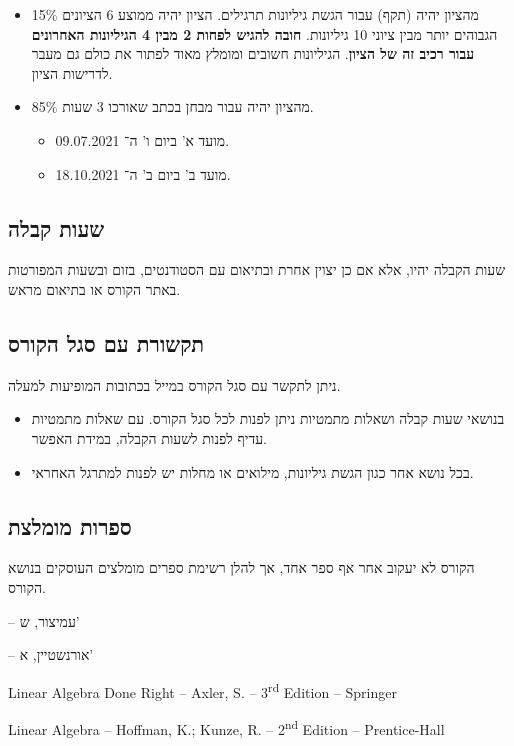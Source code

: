 \documentclass[a4paper,10pt,oneside,openany]{article}
\begin{document}
\begin{itemize}
\item
15\% מהציון יהיה (תקף) עבור הגשת גיליונות תרגילים.
הציון יהיה ממוצע 6 הציונים הגבוהים יותר מבין ציוני 10 גיליונות.
\textbf{חובה להגיש לפחות 2 מבין 4 הגיליונות האחרונים עבור רכיב זה של הציון}.
הגיליונות חשובים ומומלץ מאוד לפתור את כולם גם מעבר לדרישות הציון.

\item
85\% מהציון יהיה עבור מבחן בכתב שאורכו 3 שעות.
\begin{itemize}
\item מועד א' ביום ו' ה־%
\textenglish{09.07.2021}.
\item מועד ב' ביום ב' ה־%
\textenglish{18.10.2021}.
\end{itemize}
\end{itemize}

\subsection*{שעות קבלה}

שעות הקבלה יהיו, אלא אם כן יצוין אחרת ובתיאום עם הסטודנטים, בזום ובשעות המפורטות באתר הקורס או בתיאום מראש.

\subsection*{תקשורת עם סגל הקורס}

ניתן לתקשר עם סגל הקורס במייל בכתובות המופיעות למעלה.

\begin{itemize}
\item בנושאי שעות קבלה ושאלות מתמטיות ניתן לפנות לכל סגל הקורס. עם שאלות מתמטיות עדיף לפנות לשעות הקבלה, במידת האפשר.
\item בכל נושא אחר כגון הגשת גיליונות, מילואים או מחלות יש לפנות למתרגל האחראי.
\end{itemize}

\subsection*{ספרות מומלצת}

הקורס לא יעקוב אחר אף ספר אחד, אך להלן רשימת ספרים מומלצים העוסקים בנושא הקורס.

\begin{description}
\item[אלגברה א'] \textenglish{--} 
עמיצור, ש'

\item[אלגברה לינארית \textenglish{II}] \textenglish{--} 
אורנשטיין, א'

\begin{english}
\item[{Linear Algebra Done Right}] -- Axler, S. -- 3\textsuperscript{rd} Edition -- Springer

\item[{Linear Algebra}] -- Hoffman, K.; Kunze, R. -- 2\textsuperscript{nd} Edition -- Prentice-Hall
\end{english}
\end{description}
\end{document}
